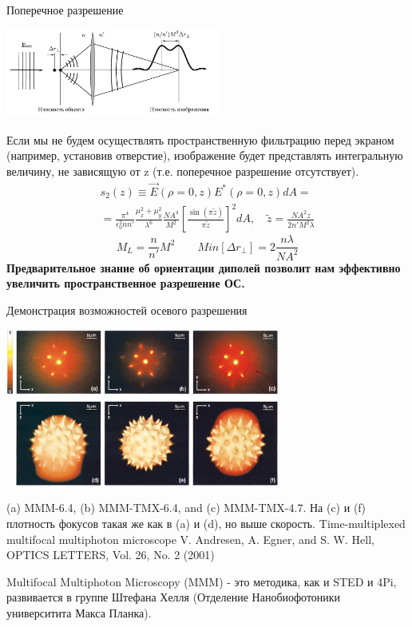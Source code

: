 \documentclass[9pt, compress, xcolor=table]{beamer}
\begin{document}
\begin{frame}{Поперечное разрешение}
\begin{center}
\includegraphics[width=7cm]{fig4_05}
\end{center}
{\small Если мы не будем осуществлять пространственную фильтрацию перед экраном (например, установив отверстие), изображение будет представлять интегральную величину, не зависящую от z (т.е. поперечное разрешение отсутствует).}
\begin{multline*}
s_2(z) \equiv \vec E(\rho = 0, z) E^{*}(\rho = 0, z) dA =\\=
\frac{\pi^4}{\epsilon_0^2 n n'} \frac{\mu_x^2 + \mu_y^2}{\lambda^6}
\frac{NA^4}{M^2}\left[\frac{\sin (\pi \tilde{z})}{\pi \tilde{z}}\right]^2 dA, \quad \tilde{z} =
\frac{NA^2 z}{2n'M^2 \lambda}
\end{multline*}
\begin{equation*}\boxed{
M_L = \frac{n}{n'} M^2\qquad Min[\Delta r_{\perp}] = 2\frac{n \lambda}{NA^2}}
\end{equation*}
{\small \textbf{Предварительное знание об ориентации диполей позволит нам эффективно увеличить пространственное разрешение ОС.}}
\end{frame}

\begin{frame}{Демонстрация возможностей осевого разрешения}

\begin{center}
\includegraphics[width=9cm]{fig4_06}
\end{center}

{\small (a) MMM-6.4, (b) MMM-TMX-6.4, and (c) MMM-TMX-4.7. На (c) и (f) плотность фокусов такая же как в (a) и (d), но выше скорость. Time-multiplexed multifocal multiphoton microscope V. Andresen, A. Egner, and S. W. Hell, OPTICS LETTERS, Vol. 26, No. 2 (2001)}

Multifocal Multiphoton Microscopy (MMM) - это методика, как и STED и 4Pi, развивается в группе Штефана Хелля (Отделение Нанобиофотоники университита Макса Планка).

\end{frame}
\end{document}
